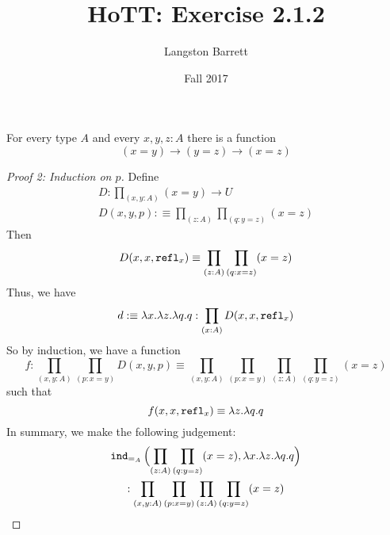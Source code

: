 \documentclass[a5paper]{article}
\begin{document}
\title{HoTT: Exercise 2.1.2}
\author{Langston Barrett}
\date{Fall 2017}

\begin{lemma*}[Lemma 2.1.2]
	For every type $A$ and every $x,y,z:A$ there is a function
  \begin{equation*}
    (x=y)\longrightarrow (y=z)\longrightarrow (x=z)
  \end{equation*}
\end{lemma*}
\begin{proof}[Proof 2: Induction on $p$]
	Define 
  \begin{gather*}
    D:\prod_{(x,y:A)}(x=y)\to U \\
    D(x,y,p):\equiv\prod_{(z:A)}\prod_{(q:y=z)} (x=z)
  \end{gather*}
  Then
  \begin{equation*}
    D(x,x,\operatorname{\mathtt{refl}}_x)\equiv \prod_{(z:A)}\prod_{(q:x=z)}(x=z)
  \end{equation*}
  Thus, we have
  \begin{equation*}
    d:\equiv\lambda x.\lambda z.\lambda q.q : \prod_{(x:A)} D(x,x,\operatorname{\mathtt{refl}}_x)
  \end{equation*}
  So by induction, we have a function
  \begin{equation*}
    f:\prod_{(x,y:A)}\prod_{(p:x=y)} D(x,y,p)\equiv\prod_{(x,y:A)}\prod_{(p:x=y)}\prod_{(z:A)}\prod_{(q:y=z)}(x=z)
  \end{equation*}
  such that 
  \begin{equation*}
    f(x,x,\operatorname{\mathtt{refl}}_x)\equiv \lambda z.\lambda q.q
  \end{equation*}
  In summary, we make the following judgement:
  \begin{multline*}
    \operatorname{\mathtt{ind}}_{=_A}\Big({\prod_{(z:A)}\prod_{(q:y=z)} (x=z)},
    {\lambda x.\lambda z.\lambda q.q}\Big) \\
    :\prod_{(x,y:A)}\prod_{(p:x=y)}\prod_{(z:A)}\prod_{(q:y=z)}(x=z)
  \end{multline*}
\end{proof}
\end{document}
